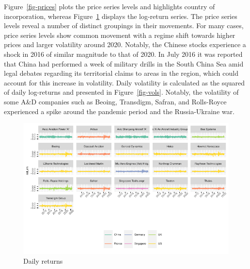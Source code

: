 \documentclass[
  letterpaper,
  DIV=11,
  numbers=noendperiod]{scrartcl}
\begin{document}
Figure~\ref{fig-prices} plots the price series levels and highlights
country of incorporation, whereas Figure~\ref{fig-rtns} displays the
log-return series. The price series levels reveal a number of distinct
groupings in their movements. For many cases, price series levels show
common movement with a regime shift towards higher prices and larger
volatility around 2020. Notably, the Chinese stocks experience a shock
in 2016 of similar magnitude to that of 2020. In July 2016 it was
reported that China had performed a week of military drills in the South
China Sea amid legal debates regarding its territorial claims to areas
in the region, which could account for this increase in volatility.
Daily volatility is calculated as the squared of daily log-returns and
presented in Figure~\ref{fig-vols}. Notably, the volatility of some A\&D
companies such as Beoing, Transdigm, Safran, and Rolls-Royce experienced
a spike around the pandemic period and the Russia-Ukraine war.

\begin{figure}[H]

{\centering \includegraphics{defence_files/figure-pdf/fig-rtns-1.pdf}

}

\caption{\label{fig-rtns}Daily returns}

\end{figure}
\end{document}
